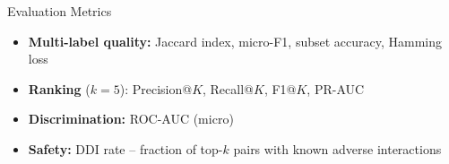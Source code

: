 \begin{frame}{Evaluation Metrics}
  \begin{itemize}
    \item \textbf{Multi-label quality:} Jaccard index, micro-F1, subset accuracy, Hamming loss
    \item \textbf{Ranking} ($k=5$): Precision@$K$, Recall@$K$, F1@$K$, PR-AUC
    \item \textbf{Discrimination:} ROC-AUC (micro)
    \pause
    \item \textbf{Safety:} DDI rate -- fraction of top-$k$ pairs with known adverse interactions
  \end{itemize}
\end{frame}
